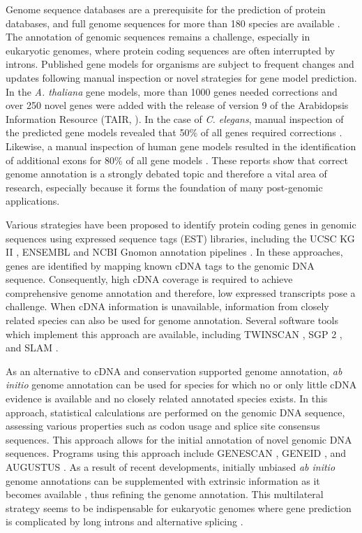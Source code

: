 Genome sequence databases are a prerequisite for the prediction of protein 
databases, and full genome sequences for more than 180 species are available
\citep{Yates2009}.
The annotation of genomic sequences remains a challenge, especially in
eukaryotic genomes, where protein coding sequences are often interrupted by
introns.
Published gene models for organisms are subject to frequent changes and updates
following manual inspection or novel strategies for gene model prediction.
In the {\em A. thaliana} gene models, more than 1000 genes needed corrections
and over 250 novel genes were added with the release of version 9 of the
Arabidopsis Information Resource (TAIR, \cite{Huala2001}).
In the case of {\em C. elegans}, manual inspection of the predicted gene models
revealed that 50\% of all genes required corrections \citep{Reboul2003}.
Likewise, a manual inspection of human gene models resulted in the 
identification of additional exons for 80\% of all gene models 
\citep{Pennisi2007}.
These reports show that correct genome annotation is a strongly debated
topic and therefore a vital area of research, especially because it forms
the foundation of many post-genomic applications.

Various strategies have been proposed to identify protein coding genes in
genomic sequences using expressed sequence tags (EST) libraries, 
including the UCSC KG II \citep{Karolchik2003}, ENSEMBL \citep{Hubbard2005} 
and NCBI Gnomon annotation pipelines \citep{Maglott2005}.
In these approaches, genes are identified by mapping known cDNA tags to the
genomic DNA sequence.
Consequently, high cDNA coverage is required to achieve comprehensive
genome annotation and therefore, low expressed transcripts pose a challenge.
When cDNA information is unavailable, information from closely related
species can also be used for genome annotation.
Several software tools which implement this approach are available,
including TWINSCAN \citep{Korf2001}, SGP 2 \citep{Parra2003}, and 
SLAM \citep{Cawley2003}.

As an alternative to cDNA and conservation supported genome annotation,
{\em ab initio} genome annotation can be used for species for which no
or only little cDNA evidence is available and no closely related annotated
species exists.
In this approach, statistical calculations are performed on the genomic
DNA sequence, assessing various properties such as codon usage and splice 
site consensus sequences.
This approach allows for the initial annotation of novel genomic DNA 
sequences.
Programs using this approach include GENESCAN \citep{Burge1997}, 
GENEID \citep{Parra2000}, and AUGUSTUS \citep{Stanke2004, Stanke2006}.
As a result of recent developments, initially unbiased {\em ab initio} 
genome annotations can be supplemented with extrinsic information as it 
becomes available \citep{Stanke2008}, thus refining the genome annotation.
This multilateral strategy seems to be indispensable for eukaryotic genomes
where gene prediction is complicated by long introns and alternative splicing
\citep{Brent2004}.


